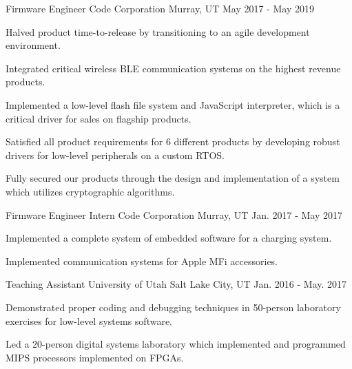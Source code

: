 \begin{cventries}
\cventry
{Firmware Engineer} %
{Code Corporation} %
{Murray, UT} %
{May 2017 - May 2019} %
{ %
\begin{cvitems}
\item Halved product time-to-release by transitioning to an agile development environment.
\item Integrated critical wireless BLE communication systems on the highest revenue products.
\item Implemented a low-level flash file system and JavaScript interpreter, which is a critical driver for sales on flagship products.
\item Satisfied all product requirements for 6 different products by developing robust drivers for low-level peripherals on a custom RTOS.
\item Fully secured our products through the design and implementation of a system which utilizes cryptographic algorithms.
\end{cvitems}
}


\cventry
{Firmware Engineer Intern} %
{Code Corporation} %
{Murray, UT} %
{Jan. 2017 - May 2017} %
{ %
\begin{cvitems}
\item Implemented a complete system of embedded software for a charging system.
\item Implemented communication systems for Apple MFi accessories.
\end{cvitems}
}


\cventry
{Teaching Assistant} %
{University of Utah} %
{Salt Lake City, UT} %
{Jan. 2016 - May. 2017} %
{ %
\begin{cvitems}
\item Demonstrated proper coding and debugging techniques in 50-person laboratory exercises for low-level systems software.
\item Led a 20-person digital systems laboratory which implemented and programmed MIPS processors implemented on FPGAs.
\end{cvitems}
}



\end{cventries}

